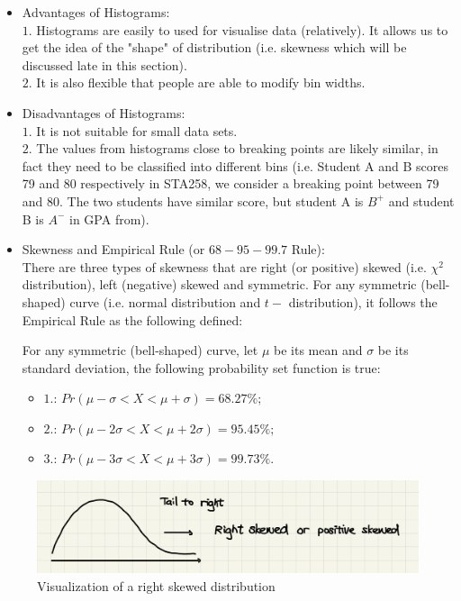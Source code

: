 \begin{itemize}
	\item Advantages of Histograms:\\
	$1.$ Histograms are easily to used for visualise data (relatively). It allows us to get the idea of the "shape" of distribution (i.e. skewness which will be discussed late in this section).\\
	$2.$ It is also flexible that people are able to modify bin widths.
	\item Disadvantages of Histograms:\\
	$1.$ It is not suitable for small data sets.\\
	$2.$ The values from histograms close to breaking points are likely similar, in fact they need to be classified into different bins (i.e. Student A and B scores 79 and 80 respectively in 		STA258, we consider a breaking point between 79 and 80. The two students have similar score, but student A is $B^+$ and student B is $A^-$ in GPA from).
	\item Skewness and Empirical Rule (or $68-95-99.7$ Rule):\\
		There are three types of skewness that are right (or positive) skewed (i.e. $\chi^{2}$ distribution), left (negative) skewed and symmetric. For any symmetric (bell-shaped) curve (i.e. normal distribution and $t-$ distribution), it follows the Empirical Rule as the following defined:
		\begin{definition}
		For any symmetric (bell-shaped) curve, let $\mu$ be its mean and $\sigma$ be its standard deviation, the following probability set function is true:
			\begin{itemize}
				\item  $1.$: $Pr(\mu - \sigma < X < \mu + \sigma) = 68.27\%;$
				\item  $2.$: $Pr(\mu - 2\sigma < X < \mu + 2\sigma) = 95.45\%;$
				\item  $3.$: $Pr(\mu - 3\sigma < X < \mu + 3\sigma) = 99.73\%.$
			\end{itemize}
		\end{definition}
		
\end{itemize}


\begin{figure}[H]
	\centering
	\includegraphics[scale=0.25]{Section1/img/RightSkewed.jpg}
	\caption{Visualization of a right skewed distribution}
\end{figure}

